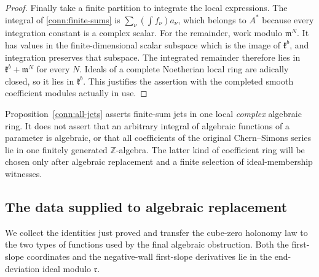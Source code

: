 \begin{proof}
Finally take a finite partition to integrate the local
expressions.  The integral of \eqref{conn:finite-sums} is
\(\sum_\nu(\int f_\nu)a_\nu\), which belongs to \(A^*\)
because every integration constant is a complex scalar.
For the remainder, work modulo \(\mathfrak m^N\).
It has values in the finite-dimensional scalar subspace
which is the image of \(\mathfrak k^b\), and integration
preserves that subspace.  The integrated remainder therefore
lies in \(\mathfrak k^b+\mathfrak m^N\) for every \(N\).
Ideals of a complete Noetherian local ring are adically
closed, so it lies in \(\mathfrak k^b\).
This justifies the assertion with the completed smooth
coefficient modules actually in use.
\end{proof}

\begin{remark}
\label{conn:fixed-ring-scope}
Proposition~\ref{conn:all-jets} asserts finite-sum jets in one
local \emph{complex} algebraic ring.  It does not assert that an
arbitrary integral of algebraic functions of a parameter is
algebraic, or that all coefficients of the original
Chern--Simons series lie in one finitely generated
\(\mathbb Z\)-algebra.  The latter kind of coefficient ring
will be chosen only after algebraic replacement and a finite
selection of ideal-membership witnesses.
\end{remark}

\subsection{The data supplied to algebraic replacement}

We collect the identities just proved and transfer the cube-zero
holonomy law to the two types of functions used by the final algebraic
obstruction.  Both the first-slope coordinates and the negative-wall
first-slope derivatives lie in the end-deviation ideal modulo
\(\mathfrak r\).

